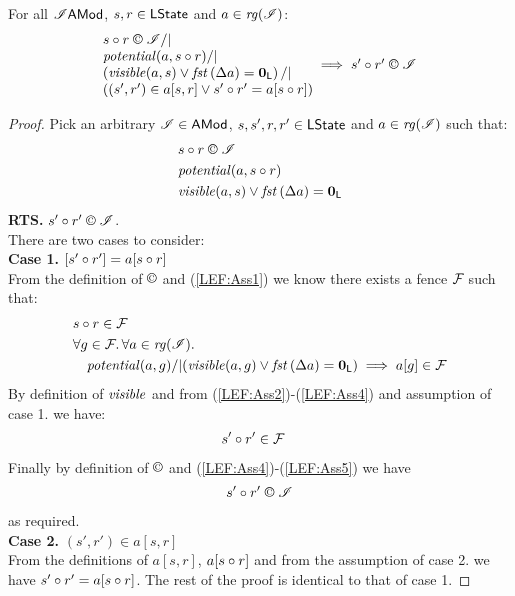 \newpage	
\begin{lemma}\label{lem:extend-confinement}
For all $\mathscr{I} \textsf{AMod}$, $s, r \in \textsf{LState}$ and $a \in \mathit{rg}(\mathscr{I})$:
%
\[
\begin{array}{l}
	\begin{array}{@{} l @{}}
		s \composeL r \confines \lmod /|\\
		\m{potential}(a, s \composeL r) /|\\
		\left(\m{visible}(a, s) \lor \fst{\updateFP{a}} = \unitL \right) /|\\
		\left((s', r') \in a[s, r] \lor s' \composeL r' = a[s \composeL r] \right)
	\end{array}
	\implies s' \composeL r' \confines \lmod
\end{array}
\]
%
\begin{proof}
Pick an arbitrary $\mathscr{I} \in \textsf{AMod}$, $s, s', r, r' \in \textsf{LState}$ and $a \in \mathit{rg}(\mathscr{I})$ such that:
%
\begin{align}
	& s \composeL r \confines \lmod \label{LEF:Ass1}\\
	& \m{potential}(a, s \composeL r) \label{LEF:Ass2}\\
	& \m{visible}(a, s) \lor \fst{\updateFP{a}} = \unitL \label{LEF:Ass0}
\end{align}
\textbf{RTS. } $s' \composeL r' \confines \lmod $.\\
There are two cases to consider:\\
\textbf{Case 1. }$[s' \circ r'] = a[s \circ r]$\\
From the definition of $\confines$ and (\ref{LEF:Ass1}) we know there exists a fence $\mathcal{F}_{}$ such that:
%
\begin{align}
	& s \circ r \in \mathcal{F}_{} \label{LEF:Ass3}\\
	& \forall g \in \mathcal{F}_{}.\, \forall a \in \mathit{rg}(\mathscr{I}).\, \nonumber\\
	& \quad \mathit{potential}(a, g) /|  (\mathit{visible}(a, g) \lor \mathit{fst}\left(\Delta {a}\right) = \mathbf{0}_{\textsf{L}})  \implies a[g] \in \mathcal{F}_{} \label{LEF:Ass4}
\end{align}
By definition of $\mathit{visible}$ and from (\ref{LEF:Ass2})-(\ref{LEF:Ass4}) and assumption of case 1. we have: 
%
\begin{align}
	& s' \circ r' \in \mathcal{F}_{} \label{LEF:Ass5}
\end{align}
%
Finally by definition of $\confines$ and (\ref{LEF:Ass4})-(\ref{LEF:Ass5}) we have
%
\begin{align*}
	s' \composeL r' \confines \lmod
\end{align*}
%
as required.\\

\noindent\textbf{Case 2. }$(s', r') \in a[s, r]$\\
From the definitions of $a[s, r]$, $a[s \circ r]$ and from the assumption of case 2. we have $s' \circ r' = a[s \circ r]$. The rest of the proof is identical to that of case 1.
\end{proof}
\end{lemma}

